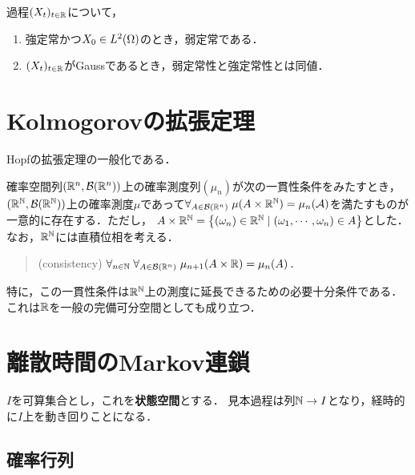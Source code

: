 \documentclass[uplatex,dvipdfmx]{jsreport}
\begin{document}
\begin{lemma}
    過程$(X_t)_{t\in\mathbb{R}}$について，
    \begin{enumerate}
        \item 強定常かつ$X_0\in L^2(\Omega)$のとき，弱定常である．
        \item $(X_t)_{t\in\mathbb{R}}$がGaussであるとき，弱定常性と強定常性とは同値．
    \end{enumerate}
\end{lemma}

\section{Kolmogorovの拡張定理}

\begin{tcolorbox}[colframe=ForestGreen, colback=ForestGreen!10!white,breakable,colbacktitle=ForestGreen!40!white,coltitle=black,fonttitle=\bfseries\sffamily,
title=]
    Hopfの拡張定理の一般化である．
\end{tcolorbox}

\begin{theorem}\label{thm-Kolmogorov-extension-theorem}
    確率空間列$(\mathbb{R}^n,\mathcal{B}(\mathbb{R}^n))$上の確率測度列$(\mu_n)$が次の一貫性条件をみたすとき，$(\mathbb{R}^{\mathbb{N}},\mathcal{B}(\mathbb{R}^{\mathbb{N}}))$上の確率測度$\mu$であって$\forall_{A\in\mathcal{B}(\mathbb{R}^n)}\;\mu(A\times\mathbb{R}^{\mathbb{N}})=\mu_n(\mathcal{A})$を満たすものが一意的に存在する．ただし，
    $A\times\mathbb{R}^{\mathbb{N}}=\left\{(\omega_n)\in\mathbb{R}^{\mathbb{N}}\mid (\omega_1,\cdots,\omega_n)\in A\right\}$とした．
    なお，$\mathbb{R}^{\mathbb{N}}$には直積位相を考える．
    \begin{quotation}
        (consistency) $\forall_{n\in\mathbb{N}}\;\forall_{A\in\mathcal{B}(\mathbb{R}^n)}\;\mu_{n+1}(A\times\mathbb{R})=\mu_n(A)$．
    \end{quotation}
    特に，この一貫性条件は$\mathbb{R}^{\mathbb{N}}$上の測度に延長できるための必要十分条件である．
    これは$\mathbb{R}$を一般の完備可分空間としても成り立つ．
\end{theorem}

\section{離散時間のMarkov連鎖}

\begin{notation}
    $I$を可算集合とし，これを\textbf{状態空間}とする．
    見本過程は列$\mathbb{N}\to I$となり，経時的に$I$上を動き回りことになる．
\end{notation}

\subsection{確率行列}
\end{document}
